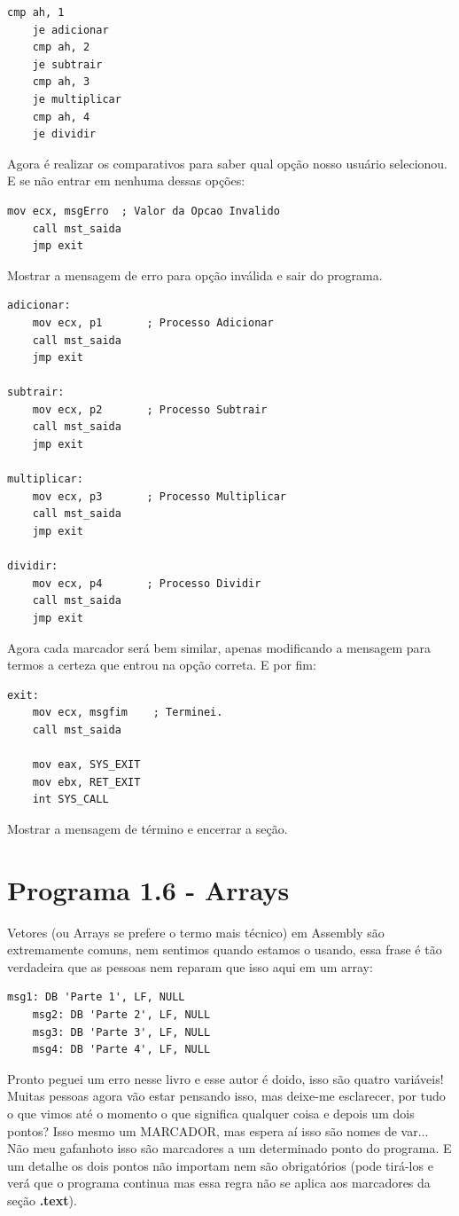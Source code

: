 \begin{lstlisting}[]
	cmp ah, 1
	je adicionar
	cmp ah, 2
	je subtrair
	cmp ah, 3
	je multiplicar
	cmp ah, 4
	je dividir
\end{lstlisting}

Agora é realizar os comparativos para saber qual opção nosso usuário selecionou. E se não entrar em nenhuma dessas opções:

\begin{lstlisting}[]
	mov ecx, msgErro  ; Valor da Opcao Invalido
	call mst_saida
	jmp exit
\end{lstlisting}

Mostrar a mensagem de erro para opção inválida e sair do programa.

\begin{lstlisting}[]
adicionar:
	mov ecx, p1       ; Processo Adicionar
	call mst_saida
	jmp exit

subtrair:
	mov ecx, p2       ; Processo Subtrair
	call mst_saida
	jmp exit

multiplicar:
	mov ecx, p3       ; Processo Multiplicar
	call mst_saida
	jmp exit

dividir:
	mov ecx, p4       ; Processo Dividir
	call mst_saida
	jmp exit
\end{lstlisting}

Agora cada marcador será bem similar, apenas modificando a mensagem para termos a certeza que entrou na opção correta. E por fim:
\begin{lstlisting}[]
exit:
	mov ecx, msgfim    ; Terminei.
	call mst_saida

	mov eax, SYS_EXIT
	mov ebx, RET_EXIT
	int SYS_CALL
\end{lstlisting}

Mostrar a mensagem de término e encerrar a seção. 

\section{Programa 1.6 - Arrays}
Vetores (ou Arrays se prefere o termo mais técnico) em Assembly são extremamente comuns, nem sentimos quando estamos o usando, essa frase é tão verdadeira que as pessoas nem reparam que isso aqui em um array:
\begin{lstlisting}[]
	msg1: DB 'Parte 1', LF, NULL
	msg2: DB 'Parte 2', LF, NULL
	msg3: DB 'Parte 3', LF, NULL
	msg4: DB 'Parte 4', LF, NULL
\end{lstlisting}

Pronto peguei um erro nesse livro e esse autor é doido, isso são quatro variáveis! Muitas pessoas agora vão estar pensando isso, mas deixe-me esclarecer, por tudo o que vimos até o momento o que significa qualquer coisa e depois um dois pontos? Isso mesmo um MARCADOR, mas espera aí isso são nomes de var... Não meu gafanhoto isso são marcadores a um determinado ponto do programa. E um detalhe os dois pontos não importam nem são obrigatórios (pode tirá-los e verá que o programa continua mas essa regra não se aplica aos marcadores da seção \textbf{.text}). 


